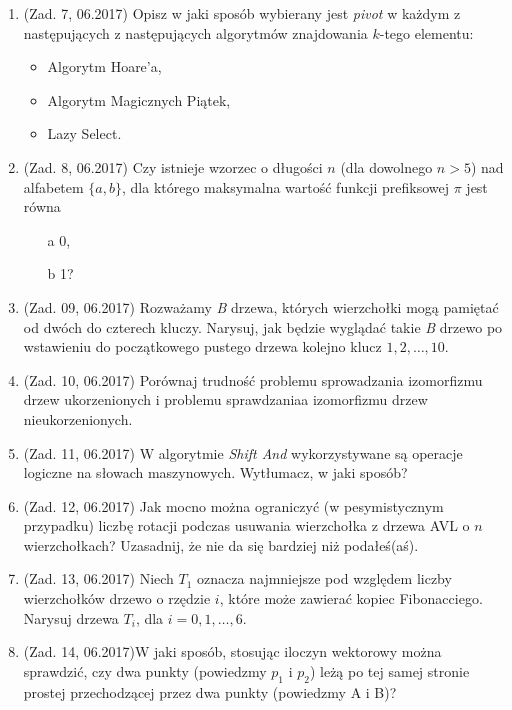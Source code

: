 \documentclass[10pt]{article}%
\begin{document}
\begin{enumerate}
\item (Zad. 7, 06.2017) Opisz w jaki sposób wybierany jest \emph{pivot} w każdym z następujących z następujących algorytmów znajdowania $k$-tego elementu: 
\begin{itemize}
\item Algorytm Hoare'a,
\item Algorytm Magicznych Piątek,
\item Lazy Select.
\end{itemize}

\item (Zad. 8, 06.2017) Czy istnieje wzorzec o długości $n$ (dla dowolnego $n>5$) nad alfabetem $\{a,b\}$, dla którego maksymalna wartość funkcji prefiksowej $\pi$ jest równa 
\begin{itemize}
\item[a] 0,
\item[b] 1?
\end{itemize}
 
\item (Zad. 09, 06.2017) Rozważamy \emph{B} drzewa, których wierzchołki mogą pamiętać od dwóch do czterech kluczy. Narysuj, jak będzie wyglądać takie \emph{B} drzewo po wstawieniu do początkowego pustego drzewa kolejno klucz $1,2,\ldots,10$.

\item (Zad. 10, 06.2017) Porównaj trudność problemu sprowadzania izomorfizmu drzew ukorzenionych i problemu sprawdzaniaa izomorfizmu drzew nieukorzenionych.

\item (Zad. 11, 06.2017) W algorytmie \emph{Shift And} wykorzystywane są operacje logiczne na słowach maszynowych. Wytłumacz, w jaki sposób?

\item (Zad. 12, 06.2017) Jak mocno można ograniczyć (w pesymistycznym przypadku) liczbę rotacji podczas usuwania wierzchołka z drzewa AVL o $n$ wierzchołkach? Uzasadnij, że nie da się bardziej niż podałeś(aś).

\item (Zad. 13, 06.2017) Niech $T_{1}$ oznacza najmniejsze pod względem liczby wierzchołków drzewo o rzędzie $i$, które może zawierać kopiec Fibonacciego. Narysuj drzewa $T_{i}$, dla $i = 0,1,\ldots,6$.

\item (Zad. 14, 06.2017)W jaki sposób, stosując iloczyn wektorowy można sprawdzić, czy dwa punkty (powiedzmy $p_1$ i $p_2$) leżą po tej samej stronie prostej przechodzącej przez dwa punkty (powiedzmy A i B)?


\end{enumerate}
\end{document}
